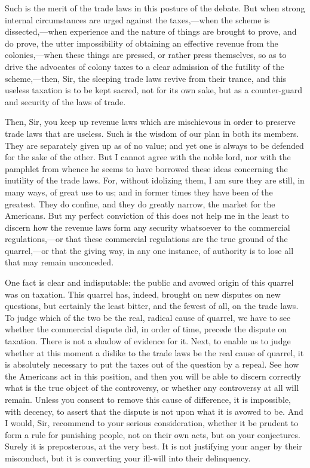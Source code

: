 Such is the merit of the trade laws in this posture of the debate. But when strong internal circumstances are urged against the taxes,—when the scheme is dissected,—when experience and the nature of things are brought to prove, and do prove, the utter impossibility of obtaining an effective revenue from the colonies,—when these things are pressed, or rather press themselves, so as to drive the advocates of colony taxes to a clear admission of the futility of the scheme,—then, Sir, the sleeping trade laws revive from their trance, and this useless taxation is to be kept sacred, not for its own sake, but as a counter-guard and security of the laws of trade.

Then, Sir, you keep up revenue laws which are mischievous in order to preserve trade laws that are useless. Such is the wisdom of our plan in both its members. They are separately given up as of no value; and yet one is always to be defended for the sake of the other. But I cannot agree with the noble lord, nor with the pamphlet from whence he seems to have borrowed these ideas concerning the inutility of the trade laws. For, without idolizing them, I am sure they are still, in many ways, of great use to us; and in former times they have been of the greatest. They do confine, and they do greatly narrow, the market for the Americans. But my perfect conviction of this does not help me in the least to discern how the revenue laws form any security whatsoever to the commercial regulations,—or that these commercial regulations are the true ground of the quarrel,—or that the giving way, in any one instance, of authority is to lose all that may remain unconceded.

One fact is clear and indisputable: the public and avowed origin of this quarrel was on taxation. This quarrel has, indeed, brought on new disputes on new questions, but certainly the least bitter, and the fewest of all, on the trade laws. To judge which of the two be the real, radical cause of quarrel, we have to see whether the commercial dispute did, in order of time, precede the dispute on taxation. There is not a shadow of evidence for it. Next, to enable us to judge whether at this moment a dislike to the trade laws be the real cause of quarrel, it is absolutely necessary to put the taxes out of the question by a repeal. See how the Americans act in this position, and then you will be able to discern correctly what is the true object of the controversy, or whether any controversy at all will remain. Unless you consent to remove this cause of difference, it is impossible, with decency, to assert that the dispute is not upon what it is avowed to be. And I would, Sir, recommend to your serious consideration, whether it be prudent to form a rule for punishing people, not on their own acts, but on your conjectures. Surely it is preposterous, at the very best. It is not justifying your anger by their misconduct, but it is converting your ill-will into their delinquency.


